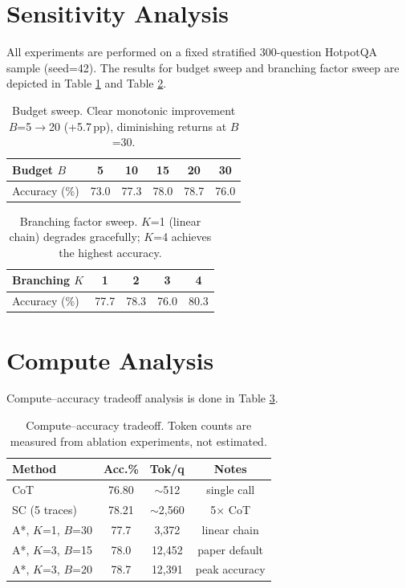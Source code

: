 \documentclass[11pt]{article}
\begin{document}
\section{Sensitivity Analysis}
\label{app:sensitivity}

All experiments are performed on a fixed stratified 300-question HotpotQA sample (seed=42). The results for budget sweep and branching factor sweep are depicted in Table \ref{tab:sensitivity_budget} and Table \ref{tab:sensitivity_branch}.

\begin{table}[h]
\centering
\small
\begin{tabular}{lccccc}
\toprule
\textbf{Budget $B$} & 5 & 10 & 15 & 20 & 30 \\
\midrule
Accuracy (\%) & 73.0 & 77.3 & 78.0 & 78.7 & 76.0 \\
\bottomrule
\end{tabular}
\caption{Budget sweep. Clear monotonic improvement $B$=5$\to$20 (+5.7\,pp), diminishing returns at $B$=30.}
\label{tab:sensitivity_budget}
\end{table}

\begin{table}[h]
\centering
\small
\begin{tabular}{lcccc}
\toprule
\textbf{Branching $K$} & 1 & 2 & 3 & 4 \\
\midrule
Accuracy (\%) & 77.7 & 78.3 & 76.0 & 80.3 \\
\bottomrule
\end{tabular}
\caption{Branching factor sweep. $K$=1 (linear chain) degrades gracefully; $K$=4 achieves the highest accuracy.}
\label{tab:sensitivity_branch}
\end{table}

\section{Compute Analysis}
\label{app:compute}
Compute--accuracy tradeoff analysis is done in Table \ref{tab:compute}.
\begin{table}[h]
\centering
\small
\begin{tabular}{lccc}
\toprule
\textbf{Method} & \textbf{Acc.\%} & \textbf{Tok/q} & \textbf{Notes} \\
\midrule
CoT & 76.80 & $\sim$512 & single call \\
SC (5 traces) & 78.21 & $\sim$2,560 & 5$\times$ CoT \\
A*, $K$=1, $B$=30 & 77.7 & 3,372 & linear chain \\
A*, $K$=3, $B$=15 & 78.0 & 12,452 & paper default \\
A*, $K$=3, $B$=20 & 78.7 & 12,391 & peak accuracy \\
\bottomrule
\end{tabular}
\caption{Compute--accuracy tradeoff. Token counts are measured from ablation experiments, not estimated.}
\label{tab:compute}
\end{table}
\end{document}
